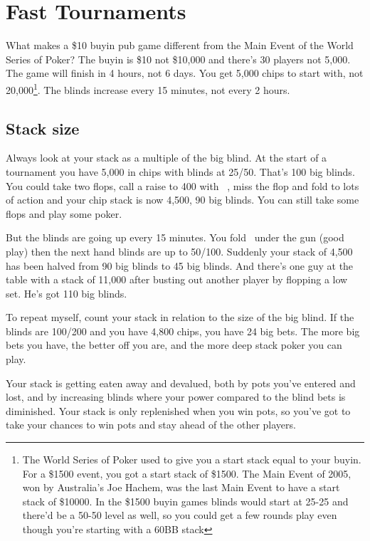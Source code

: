 \chapter{Fast Tournaments}


What makes a \$10 buyin pub game different from the Main Event of
the World Series of Poker? The buyin is \$10 not \$10,000 and there's 30
players not 5,000. The game will finish in 4 hours, not 6 days. You get
5,000 chips to start with, not 20,000\footnote{The World Series of Poker
used to give you a start stack equal to your buyin. For a \$1500 event,
you got a start stack of \$1500. The Main Event of 2005, won by Australia's
Joe Hachem, was the last Main Event to have a start stack of \$10000. In
the \$1500 buyin games blinds would start at 25-25 and there'd be a 50-50
level as well, so you could get a few rounds play even though you're
starting with a 60BB stack}. The blinds increase every 15 minutes, not
every 2 hours.

\section{Stack size}

Always look at your stack as a multiple of the big blind.
At the start of a tournament you have 5,000 in chips with blinds
at 25/50. That's 100 big blinds. You could take two flops, call a raise to
400 with \sixh\sixs\ , miss the flop and fold to lots of action and your
chip stack is now 4,500, 90 big blinds. You can still take some flops
and play some poker.

But the blinds are going up every 15 minutes. You fold \As\eigh\ under
the gun (good play) then the next hand blinds are up to 50/100.
Suddenly your stack of 4,500 has been halved from 90 big blinds to 45
big blinds. And there's one guy at the table with a stack of 11,000 after
busting out another player by flopping a low set. He's got 110 big blinds.

To repeat myself, count your stack in relation to the size of
the big blind. If the blinds are 100/200 and you have 4,800 chips, you
have 24 big bets. The more big bets you have, the better off you are,
and the more deep stack poker you can play.

Your stack is getting eaten away and devalued, both by pots you've entered
and lost, and by increasing blinds where your power compared to the blind bets
is diminished. Your stack is only replenished when you win pots, so you've
got to take your chances to win pots and stay ahead of the other players.

